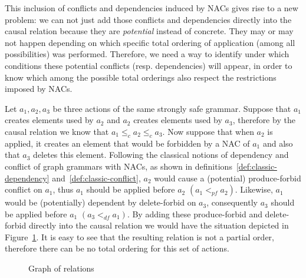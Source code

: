 This inclusion of conflicts and dependencies induced by NACs gives rise to a new problem: we can not just add those conflicts and dependencies directly into the causal relation because they are \textit{potential} instead of concrete. They may or may not happen depending on which specific total ordering of application (among all possibilities) was performed. Therefore, we need a way to identify under which conditions these potential conflicts (resp. dependencies) will appear, in order to know which among the possible total orderings also respect the restrictions imposed by NACs.

\begin{example}
Let $a_1, a_2, a_3$ be three actions of the same strongly safe grammar. 
  Suppose that $a_1$ creates elements used by $a_2$ and $a_2$ creates elements used by $a_3$, therefore by the causal relation we know that $a_1 \leq_c a_2 \leq_c a_3$. 
  Now suppose that when $a_2$ is applied, it creates an element that would be forbidden by a NAC of $a_1$ and also that $a_3$ deletes this element. 
  Following the classical notions of dependency and conflict of graph grammars with NACs, as shown in  definitions~\ref{def:classic-dependency} and~\ref{def:classic-conflict}, $a_2$ would cause a (potential) produce-forbid conflict on $a_1$, thus $a_1$ should be applied before $a_2$ $(a_1 <_{pf} a_2)$. Likewise, $a_1$ would be (potentially) dependent by delete-forbid on $a_3$, consequently $a_3$ should be applied before $a_1$ $(a_3 <_{df} a_1)$. By adding these produce-forbid and delete-forbid directly into the causal relation we would have the situation depicted in Figure~\ref{fig:process:order:occurrence-relation-fail}. It is easy to see that the resulting relation is not a partial order, therefore there can be no total ordering for this set of actions.
\begin{figure}[!ht]
  \centering
  \caption{Graph of relations}\label{fig:process:order:occurrence-relation-fail}
\end{figure}


\end{example}
